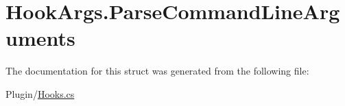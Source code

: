 \hypertarget{structOTA_1_1Plugin_1_1HookArgs_1_1ParseCommandLineArguments}{}\section{Hook\+Args.\+Parse\+Command\+Line\+Arguments}
\label{structOTA_1_1Plugin_1_1HookArgs_1_1ParseCommandLineArguments}


The documentation for this struct was generated from the following file\+:\begin{DoxyCompactItemize}
\item 
Plugin/\hyperlink{Hooks_8cs}{Hooks.\+cs}\end{DoxyCompactItemize}
